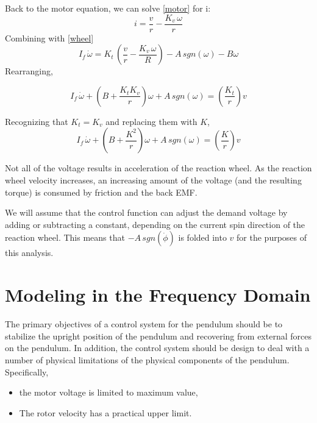 \documentclass[12pt,letterpaper]{article}
\begin{document}
Back to the motor equation, we can solve \eqref{motor} for i:
%
\begin{equation}
    i = \frac{v}{r} - \frac{K_{v} \, \omega}{r}
\end{equation}
%
Combining with \eqref{wheel}
%
\begin{equation}
    I_{f} \, \dot{\omega}  =  K_{t} \, \left( \frac{v}{r} - \frac{ K_{v} \, \omega}{R} \right) - A \, sgn(\omega ) - B \omega
\end{equation}
Rearranging,

\begin{equation}
    I_{f} \, \dot{\omega} + \left( B+\frac{K_{t} K_{v}}{r} \right) \omega +A \, sgn(\omega)= \left(\frac{K_{t}} {r}\right)v 
\end{equation}

Recognizing that $K_{t} = K_{v}$ and replacing them with $K$,
\begin{equation}
    I_{f} \, \dot{\omega} + \left( B+\frac{K^2}{r} \right) \omega +A \, sgn(\omega)= \left(\frac{K} {r}\right)v\label{eq.motorFinal} 
\end{equation}

Not all of the voltage results in acceleration of the reaction wheel.  As the reaction wheel velocity increases, an
increasing amount of the voltage (and the resulting torque) is consumed by friction and the back EMF.

We will assume that the control function can adjust the demand voltage by adding or subtracting a constant, depending on the current spin direction of the reaction wheel.  This means that $-A\,sgn(\dot{\phi})$ is folded
into $v$ for the purposes of this analysis.  









\section{Modeling in the Frequency Domain}


The primary objectives of a control system for the pendulum should be to stabilize the upright position of the pendulum and recovering from external forces on the pendulum.  In addition, the control system should be design to deal with a number
of physical limitations of the physical components of the pendulum.  Specifically,
\begin{itemize}
    \item the motor voltage is limited to maximum value,
    \item The rotor velocity has a practical upper limit.
\end{itemize}
\end{document}
